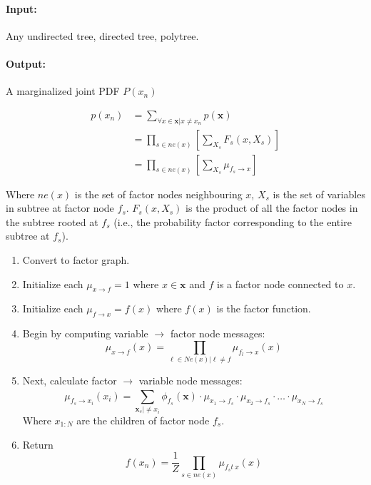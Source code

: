 \documentclass[a4paper,12pt]{report}
\begin{document}
\paragraph{Input: } Any undirected tree, directed tree, polytree.

\paragraph{Output: } A marginalized joint PDF $P(x_n)$

\begin{equation}
\begin{split}
p(x_n) &= \sum_{\forall x\in \pmb x | x\neq x_n}^{} p(\pmb x) \\
&= \prod_{s\in ne(x)} [\sum_{X_s}^{} F_s(x, X_s)] \\
&= \prod_{s\in ne(x)} [\sum_{X_s} \mu_{f_s\to x}]
\end{split}
\end{equation}

Where $ne(x)$ is the set of factor nodes neighbouring $x$, $X_s$ is the set of variables in subtree at factor node $f_s$. $F_s(x, X_s)$ is the product of all the factor nodes in the subtree rooted at $f_s$ (i.e., the probability factor corresponding to the entire subtree at $f_s$). 


\begin{enumerate}
\item Convert to factor graph.
\item Initialize each $\mu_{x\to f} = 1$ where $x\in \pmb x$ and $f$ is a factor node connected to $x$.
\item Initialize each $\mu_{f\to x} = f(x)$ where $f(x)$ is the factor function.

\item Begin by computing variable $\to$ factor node messages:
\begin{equation}
\mu_{x\to f}(x) = \prod_{\ell \in Ne(x) | \ell \neq f} \mu_{f_l \to x}(x)
\end{equation}

\item Next, calculate factor $\to$ variable node messages:
\begin{equation}
\mu_{f_s\to x_i}(x_i) = \sum_{\pmb x_s | \neq x_i}^{} \phi_{f_s}(\pmb x) \cdot \mu_{x_1 \to f_s} \cdot \mu_{x_2 \to f_s} \cdot \dots \cdot \mu_{x_N \to f_s}
\end{equation}
Where $x_{1:N}$ are the children of factor node $f_s$.

\item Return \begin{equation}
f(x_n) = \frac{1}{Z} \prod_{s\in ne(x)} \mu_{f_s t\ x}(x)
\end{equation}
\end{enumerate}
\end{document}
